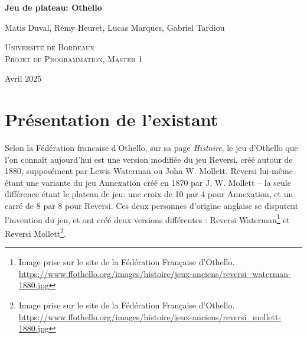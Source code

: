 \documentclass[a4paper,12pt]{article}
\begin{document}
\begin{titlepage}
    \centering
    \vspace*{1cm}
    {\huge\bfseries Jeu de plateau: Othello}
    \vspace{3cm}

    {Matis Duval, Rémy Heuret, Lucas Marques, Gabriel Tardiou}
    \vspace{2cm}

    {\scshape\small Université de Bordeaux\\}
    \vspace{1cm}
    {\scshape\small Projet de Programmation, Master 1}
    \vspace{1cm}

    \vfill
    {\large Avril 2025}
\end{titlepage}

\newpage

\tableofcontents

\newpage

\section{Présentation de l'existant}

Selon la Fédération francaise d’Othello, sur sa page \textit{Histoire}, le jeu
d’Othello que l’on connaît aujourd’hui est une version modifiée du jeu Reversi,
créé autour de 1880, supposément par Lewis Waterman ou John W.
Mollett.\cite{FFOthelloHistoire} Reversi lui-même étant une variante du jeu
Annexation créé en 1870 par J. W. Mollett – la seule différence étant le
plateau de jeu: une croix de 10 par 4 pour
Annexation\cite{TameTheBoardGameAnnexation}, et un carré de 8 par 8 pour
Reversi. Ces deux personnes d’origine anglaise se disputent l’invention du jeu,
et ont créé deux versions différentes : Reversi Waterman\footnote{Image prise
    sur le site de la Fédération Française d’Othello.
    \url{https://www.ffothello.org/images/histoire/jeux-anciens/reversi_waterman-1880.jpg}}
et Reversi Mollett\footnote{Image prise sur le site de la Fédération Française
    d’Othello.
    \url{https://www.ffothello.org/images/histoire/jeux-anciens/reversi_mollett-1880.jpg}}.\\
\end{document}
